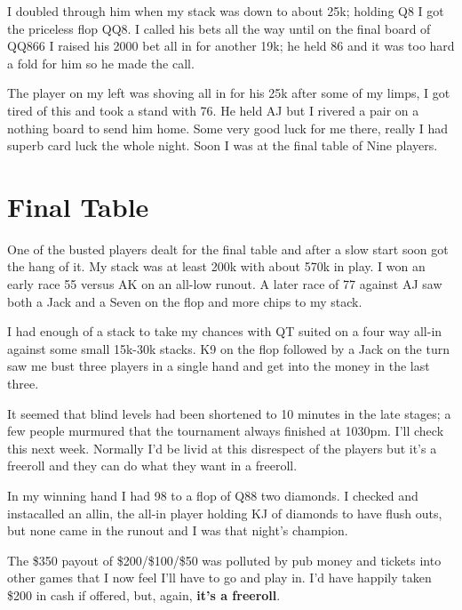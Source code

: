 I doubled through him when my stack was down to about 25k; holding
Q8 I got the priceless flop QQ8. I called his bets all the way
until on the final board of QQ866 I raised his 2000 bet all in
for another 19k; he held 86 and it was too hard a fold for him
so he made the call.

The player on my left was shoving all in for his 25k after some
of my limps, I got tired of this and took a stand with 76. He
held AJ but I rivered a pair on a nothing board to send him
home. Some very good luck for me there, really I had superb
card luck the whole night. Soon I was at the final table of
Nine players.

\section{Final Table}

One of the busted players dealt for the final table and after
a slow start soon got the hang of it. My stack was at least
200k with about 570k in play. I won an early race 55 versus AK
on an all-low runout. A later race of 77 against AJ saw
both a Jack and a Seven on the flop and more chips to my stack.

I had enough of a stack to take my chances with QT suited on a
four way all-in against some small 15k-30k stacks. K9 on the flop
followed by a Jack on the turn saw me bust three players in
a single hand and get into the money in the last three.

It seemed that blind levels had been shortened to 10 minutes in
the late stages; a few people murmured that the tournament
always finished at 1030pm. I'll check this next week. Normally
I'd be livid at this disrespect of the players but it's
a freeroll and they can do what they want in a freeroll.

In my winning hand I had 98 to a flop of Q88 two diamonds.
I checked and instacalled an allin, the all-in player holding
KJ of diamonds to have flush outs, but none came in the runout
and I was that night's champion.

The \$350 payout of \$200/\$100/\$50 was polluted by
pub money and tickets into other games that I now feel
I'll have to go and play in. I'd have happily taken
\$200 in cash if offered, but, again, \textbf{it's a freeroll}.
